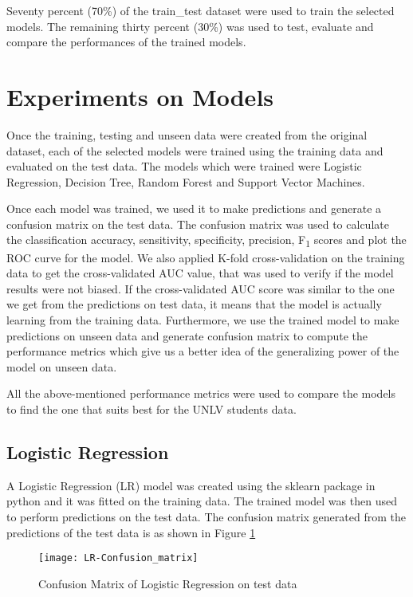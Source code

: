 \documentclass[11pt,openright]{report}
\begin{document}
Seventy percent (70\%) of the train\_test dataset were used to train the selected models. The remaining thirty percent (30\%) was used to test, evaluate and compare the performances of the trained models. 

\section {Experiments on Models}
Once the training, testing and unseen data were created from the original dataset, each of the selected models were trained using the training data and evaluated on the test data. The models which were trained were Logistic Regression, Decision Tree, Random Forest and Support Vector Machines. 

Once each model was trained, we used it to make predictions and generate a confusion matrix on the test data. The confusion matrix was used to calculate the classification accuracy, sensitivity, specificity, precision, F\textsubscript{1} scores and plot the ROC curve for the model. We also applied K-fold cross-validation on the training data to get the cross-validated AUC value, that was used to verify if the model results were not biased. If the cross-validated AUC score was similar to the one we get from the predictions on test data, it means that the model is actually learning from the training data. Furthermore, we use the trained model to make predictions on unseen data and generate confusion matrix to compute the performance metrics which give us a better idea of the generalizing power of the model on unseen data.

All the above-mentioned performance metrics were used to compare the models to find the one that suits best for the UNLV students data. 

\subsection {Logistic Regression}
A Logistic Regression (LR) model was created using the sklearn package in python and it was fitted on the training data. The trained model was then used to perform predictions on the test data. The confusion matrix generated from the predictions of the test data is as shown in Figure \ref{fig:lr_confusion_matrix}

  \begin{figure}[!htb]
	\centering
	\texttt{[image: LR-Confusion\_matrix]}
	\caption{Confusion Matrix of Logistic Regression on test data}
	\label{fig:lr_confusion_matrix}
\end{figure} 
\end{document}
